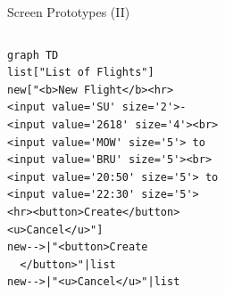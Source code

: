 \documentclass[aspectratio=43,handout,bigger]{beamer}
\begin{document}
\begin{frame}[fragile]{Screen Prototypes (II)}
  \begin{columns}
    \begin{column}{.6\textwidth}
\begin{verbatim}
graph TD
list["List of Flights"]
new["<b>New Flight</b><hr>
<input value='SU' size='2'>-
<input value='2618' size='4'><br>
<input value='MOW' size='5'> to
<input value='BRU' size='5'><br>
<input value='20:50' size='5'> to
<input value='22:30' size='5'>
<hr><button>Create</button>
<u>Cancel</u>"]
new-->|"<button>Create
  </button>"|list
new-->|"<u>Cancel</u>"|list
\end{verbatim}
    \end{column}
    \begin{column}{.3\textwidth}
    \end{column}
  \end{columns}
\end{frame}
\end{document}
